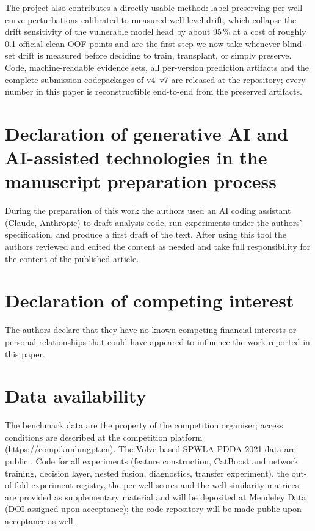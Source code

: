 \documentclass[preprint,12pt]{elsarticle}
\begin{document}
The project also contributes a directly usable method: label-preserving per-well curve perturbations calibrated to measured well-level drift, which collapse the drift sensitivity of the vulnerable model head by about 95\,\% at a cost of roughly 0.1 official clean-OOF points and are the first step we now take whenever blind-set drift is measured before deciding to train, transplant, or simply preserve. Code, machine-readable evidence sets, all per-version prediction artifacts and the complete submission codepackages of v4--v7 are released at the repository; every number in this paper is reconstructible end-to-end from the preserved artifacts.

\section*{Declaration of generative AI and AI-assisted technologies in the manuscript preparation process}
During the preparation of this work the authors used an AI coding assistant (Claude, Anthropic) to draft analysis code, run experiments under the authors' specification, and produce a first draft of the text. After using this tool the authors reviewed and edited the content as needed and take full responsibility for the content of the published article.

\section*{Declaration of competing interest}
The authors declare that they have no known competing financial interests or personal relationships that could have appeared to influence the work reported in this paper.

\section*{Data availability}
The benchmark data are the property of the competition organiser; access conditions are described at the competition platform (\url{https://comp.kunlungpt.cn}). The Volve-based SPWLA PDDA 2021 data are public \cite{pddasig2021}. Code for all experiments (feature construction, CatBoost and network training, decision layer, nested fusion, diagnostics, transfer experiment), the out-of-fold experiment registry, the per-well scores and the well-similarity matrices are provided as supplementary material and will be deposited at Mendeley Data (DOI assigned upon acceptance); the code repository will be made public upon acceptance as well.
\end{document}
